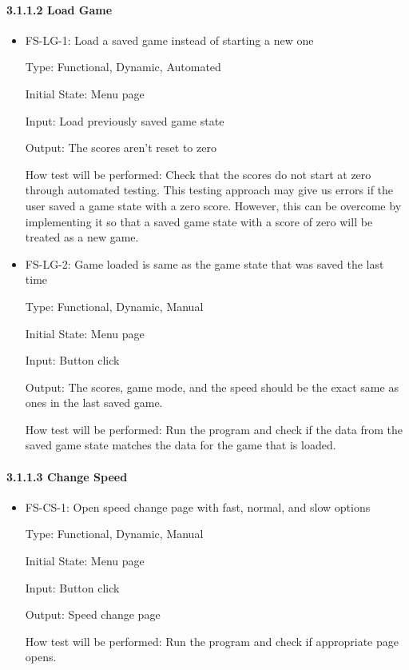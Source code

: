 \documentclass[12pt,letterpaper]{article}
\begin{document}
	\paragraph{3.1.1.2 Load Game}
\begin{reqbox}
	\begin{itemize}
	\item FS-LG-1: Load a saved game instead of starting a new one

	Type: Functional, Dynamic, Automated

	Initial State: Menu page

	Input: Load previously saved game state

	Output: The scores aren’t reset to zero

	How test will be performed: Check that the scores do not start at zero through automated testing. This testing approach may give us errors if the user saved a game state with a zero score. However, this can be overcome by implementing it so that a saved game state with a score of zero will be treated as a new game.
	\end{itemize}
\end{reqbox}

\begin{reqbox}
	\begin{itemize}
	\item FS-LG-2: Game loaded is same as the game state that was saved the last time

	Type: Functional, Dynamic, Manual

	Initial State: Menu page

	Input: Button click

	Output: The scores, game mode, and the speed should be the exact same as ones in the last saved game.

	How test will be performed: Run the program and check if the data from the saved game state matches the data for the game that is loaded.
	\end{itemize}
\end{reqbox}

	\paragraph{3.1.1.3 Change Speed}
\begin{reqbox}
	\begin{itemize}
	\item FS-CS-1: Open speed change page with fast, normal, and slow options

	Type: Functional, Dynamic, Manual

	Initial State: Menu page

	Input: Button click

	Output: Speed change page

	How test will be performed: Run the program and check if appropriate page opens.
	\end{itemize}
\end{reqbox}
\end{document}
